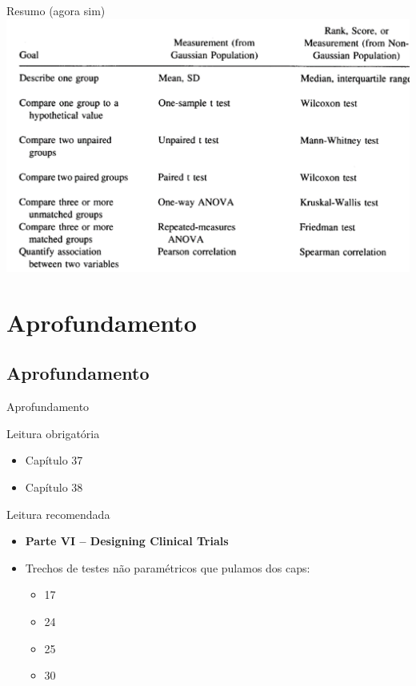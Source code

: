\documentclass{beamer}
\begin{document}
\begin{frame}{\scriptsize Resumo (agora sim)}
  \includegraphics[width=\textwidth]{Cap37-38/metodos2}
\end{frame}

\section{Aprofundamento}

\subsection{Aprofundamento}

\begin{frame}{\scriptsize Aprofundamento}
  \begin{block}{Leitura obrigatória}
    \footnotesize
    \begin{itemize}
      \footnotesize
    \item Capítulo 37
    \item Capítulo 38
    \end{itemize}
  \end{block}
  \begin{block}{Leitura recomendada}
    \begin{itemize}
      \scriptsize
    \item {\bf Parte VI -- Designing Clinical Trials}
    \scriptsize
    \item Trechos de testes não paramétricos que pulamos dos caps:
      \begin{itemize}
        \scriptsize
      \item 17
      \item 24
      \item 25
      \item 30
      \end{itemize}
    \end{itemize}
  \end{block}
\end{frame}
\end{document}
